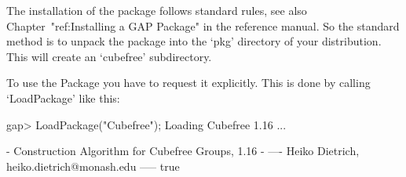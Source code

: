 

\null

The installation of the {\Cubefree} package follows standard {\GAP} rules, see
also 
Chapter~"ref:Installing a GAP Package" in the {\GAP} reference manual.
So the standard method is to unpack the package into the `pkg'
directory  of your {\GAP} distribution.  This will create an `cubefree'
subdirectory. 

\null

To use the {\Cubefree} Package you have to request it explicitly. This  is
done by calling `LoadPackage' like this:

\beginexample
gap> LoadPackage("Cubefree");
Loading Cubefree 1.16 ...

   - Construction Algorithm for Cubefree Groups, 1.16 -
   ---- Heiko Dietrich, heiko.dietrich@monash.edu -----
true
\endexample


